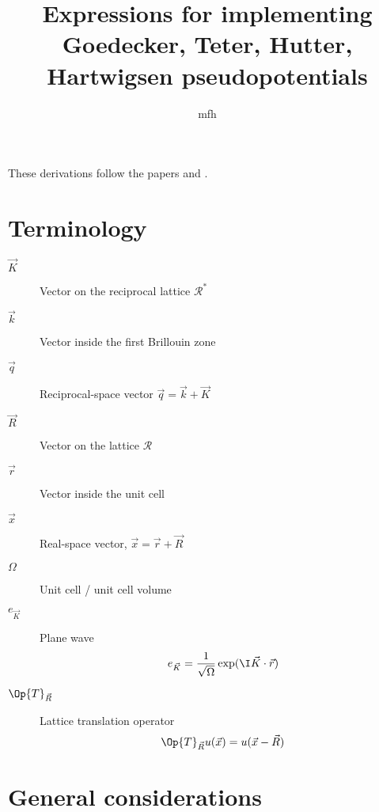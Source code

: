 \documentclass{MFHarticle}
\begin{document}
\title{Expressions for implementing Goedecker, Teter, Hutter,
Hartwigsen pseudopotentials}
\author{mfh}
\maketitle

These derivations follow the papers \citet{Goedecker1996}
and \citet{Hartwigsen1998}.

\section{Terminology}
\begin{description}
	\item[$\vec{K}$] Vector on the reciprocal lattice $\mathcal{R}^\ast$
	\item[$\vec{k}$] Vector inside the first Brillouin zone
	\item[$\vec{q}$] Reciprocal-space vector $\vec{q} = \vec{k} + \vec{K}$
	\item[$\vec{R}$] Vector on the lattice $\mathcal{R}$
	\item[$\vec{r}$] Vector inside the unit cell
	\item[$\vec{x}$] Real-space vector, $\vec{x} = \vec{r} + \vec{R}$
	\item[$\Omega$] Unit cell / unit cell volume
	\item[$e_{\vec{K}}$] Plane wave
		\[ e_{\vec{K}} = \frac1{\sqrt{\Omega}} \exp(\I \vec{K} \cdot \vec{r})\]
	\item[$\Op{T}_{\vec{R}}$] Lattice translation operator
		\[ \Op{T}_{\vec{R}} u(\vec{x}) = u(\vec{x} - \vec{R}) \]
\end{description}

\section{General considerations}
\end{document}
